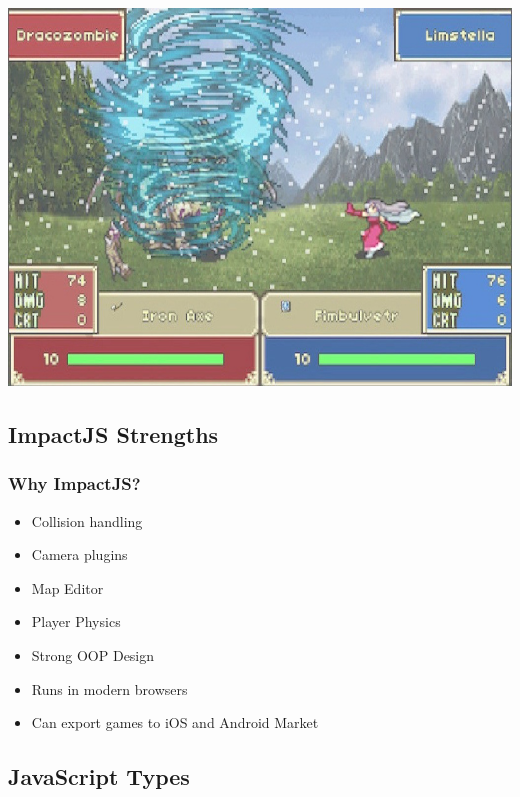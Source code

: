\documentclass[red]{beamer}
\begin{document}
\begin{frame}
\includegraphics[height=0.9\textheight]{fireemblem.jpg}
\end{frame}

\subsection{ImpactJS Strengths}

\begin{frame}
  \frametitle{Why ImpactJS?}   %

  \begin{itemize}
  \item<1-> Collision handling
  \item<2-> Camera plugins
  \item<3-> Map Editor
  \item<4-> Player Physics
  \item<5-> Strong OOP Design
  \item<6-> Runs in modern browsers
  \item<7-> Can export games to iOS and Android Market
  \end{itemize}
\end{frame}

\subsection{JavaScript Types}
\end{document}
